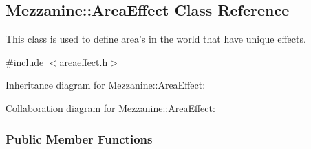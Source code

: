 \hypertarget{classMezzanine_1_1AreaEffect}{\subsection{Mezzanine\-:\-:Area\-Effect Class Reference}
\label{classMezzanine_1_1AreaEffect}
}


This class is used to define area's in the world that have unique effects.  




{\ttfamily \#include $<$areaeffect.\-h$>$}



Inheritance diagram for Mezzanine\-:\-:Area\-Effect\-:


Collaboration diagram for Mezzanine\-:\-:Area\-Effect\-:
\subsubsection*{Public Member Functions}
